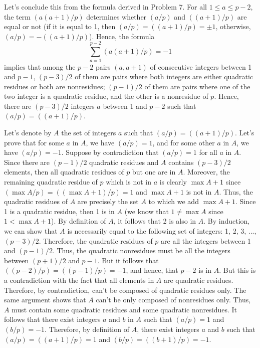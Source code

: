\begin{solution}
    Let's conclude this from the formula derived in Problem 7. For all $1 \leq a \leq p-2$, the term $(a(a+1)/p)$ determines whether $(a/p)$ and $((a+1)/p)$ are equal or not (if it is equal to 1, then $(a/p) = ((a+1)/p) = \pm 1$, otherwise, $(a/p) = -((a+1)/p)$). Hence, the formula
    $$\sum_{a=1}^{p-2}(a(a+1)/p) = -1$$
    implies that among the $p-2$ pairs $(a, a+1)$ of consecutive integers between 1 and $p-1$, $(p-3)/2$ of them are pairs where both integers are either quadratic residues or both are nonresidues; $(p-1)/2$ of them are pairs where one of the two integer is a quadratic residue, and the other is a nonresidue of $p$. Hence, there are $(p-3)/2$ integers $a$ between 1 and $p-2$ such that $(a/p) = ((a+1)/p)$.
    
    Let's denote by $A$ the set of integers $a$ such that $(a/p) = ((a+1)/p)$. Let's prove that for some $a$ in $A$, we have $(a/p) = 1$, and for some other $a$ in $A$, we have $(a/p) = -1$. Suppose by contradiction that $(a/p) = 1$ for all $a$ in $A$. Since there are $(p-1)/2$ quadratic residues and $A$ contains $(p-3)/2$ elements, then all quadratic residues of $p$ but one are in $A$. Moreover, the remaining quadratic residue of $p$ which is not in $a$ is clearly $\max A + 1$ since $(\max A /p) = ((\max A + 1)/ p) = 1$ and $\max A + 1$ is not in $A$. Thus, the quadratic residues of $A$ are precisely the set $A$ to which we add $\max A + 1$. Since 1 is a quadratic residue, then 1 is in $A$ (we know that $1 \neq \max A$ since $1 < \max A + 1$). By definition of $A$, it follows that 2 is also in $A$. By induction, we can show that $A$ is necessarily equal to the following set of integers: 1, 2, 3, ..., $(p-3)/2$. Therefore, the quadratic residues of $p$ are all the integers between 1 and $(p-1)/2$. Thus, the quadratic nonresidues must be all the integers between $(p+1)/2$ and $p-1$. But it follows that $((p-2)/p) = ((p-1)/p) = -1$, and hence, that $p-2$ is in $A$. But this is a contradiction with the fact that all elements in $A$ are quadratic residues. Therefore, by contradiction, can't be composed of quadratic residues only. The same argument shows that $A$ can't be only composed of nonresidues only. Thus, $A$ must contain some quadratic residues and some quadratic nonresidues. It follows that there exist integers $a$ and $b$ in $A$ such that $(a/p) = 1$ and $(b/p) = -1$. Therefore, by definition of $A$, there exist integers $a$ and $b$ such that $(a/p) = ((a+1)/p) = 1$ and $(b/p) = ((b+1)/p) = -1$. \\
\end{solution}

